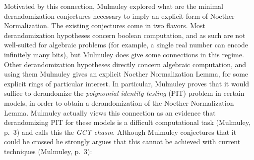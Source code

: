 \documentclass[letterpaper,11pt]{article}
\numberwithin{equation}{section}
\theoremstyle{plain}
\theoremstyle{remark}
\newcommand{\ignore}[1]{}
\begin{document}
Motivated by this connection, Mulmuley explored what are the minimal derandomization conjectures  necessary to imply an explicit form of Noether Normalization.  The existing conjectures come in two flavors.  Most derandomization hypotheses concern boolean computation, and as such are not well-suited for algebraic problems (for example, a single real number can encode infinitely many bits), but Mulmuley does give some connections in this regime. Other derandomization hypotheses directly concern algebraic computation, and using them Mulmuley gives an explicit Noether Normalization Lemma, for some explicit rings of particular interest.  In particular, Mulmuley proves that it would suffice to derandomize the \textit{polynomial identity testing} (PIT) problem in certain models, in order to obtain a derandomization of the Noether Normalization Lemma.  Mulmuley actually views this connection as an evidence that derandomizing PIT for these models is a difficult computational task (Mulmuley, p.\ 3) and calls this the {\em GCT chasm}. Although Mulmuley conjectures that it could be crossed he strongly argues that this cannot be achieved with current techniques (Mulmuley, p.\ 3):

\ignore{

\begin{quote}
	These and related results may explain in a unified way why proving lower bounds or derandomization results for arithmetic circuits in characteristic zero of even depth three or constant-depth Boolean threshold circuits, or proving uniform Boolean conjectures such as $\EXP^\NP\not\subseteq\Sigma_2^P\cap\Pi_2^P$  has turned out to be so hard, and also why the classification problems of invariant theory and algebraic geometry have turned out to be so hard from the complexity-theoretic perspective.
\end{quote}

Mulmuley calls this the {\em GCT chasm} and conjectures that it could be crossed (Mulmuley, p.\ 12):

\begin{quote}
	We conjecture that (separating) e.s.o.p's exist for the $K[V]^G$'s under consideration and the coordinate rings of explicit varieties in general: i.e., Noether's Normalization Lemma for these rings can be derandomized (in a strong form), as suggested by Theorems 1.1, 1.2, 1.3, 1.5 and 1.6, cf. Conjecture 11.1, and the GCT chasm can be crossed.
\end{quote}

However, Mulmuley has strongly suggested that crossing this chasm is difficult (Mulmuley, p.\ 3):

}
\end{document}
